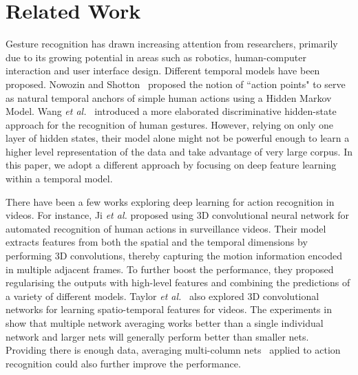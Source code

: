 
\section{Related Work}
\label{sec:relatedwork}

Gesture recognition has drawn increasing attention from researchers, primarily due to its growing potential in areas such as robotics, human-computer interaction and user interface design. Different temporal models have been proposed.
Nowozin and Shotton~\cite{nowozin2012action} proposed the notion of ``action points" to serve as natural temporal anchors of simple human actions using a Hidden Markov Model.
Wang \emph{et al.}~\cite{wang2006hidden} introduced a more elaborated discriminative hidden-state approach for the recognition of human gestures.
However, relying on only one layer of hidden states,
their model alone might not  be powerful enough to learn a higher level representation of the data and take advantage of very large corpus. In this paper, we adopt a different approach by focusing on deep feature learning within a temporal model.

There have been a few works exploring deep learning for action recognition in videos. For instance, Ji \emph{et al.}\cite{ji20133d} proposed using 3D convolutional neural network for automated recognition of human actions in surveillance videos. Their model extracts features from both the spatial and the temporal dimensions by performing 3D convolutions, thereby capturing the motion information encoded in multiple adjacent frames. To further boost the performance, they proposed regularising the outputs with high-level features and combining the predictions of a variety of different models. Taylor \emph{et al.}~\cite{taylor2010convolutional}  also explored 3D convolutional networks for learning spatio-temporal features for videos. The experiments in~\cite{wu2014deep} show that multiple network averaging works better than a single individual network and larger nets  will generally perform better than smaller nets.
Providing there is enough data, averaging multi-column nets~\cite{ciresan2012multi} applied to
action recognition could also further improve the performance.

